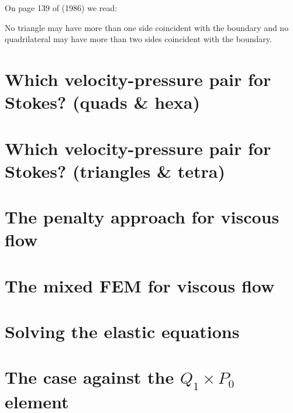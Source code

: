 On page 139 of \textcite{caod86} (1986) we read:
\begin{displayquote}
{\color{darkgray}
No triangle may have more than one side coincident with the boundary
and no quadrilateral may have more than two sides coincident with the boundary.
}
\end{displayquote}

\newpage %
\section{Which velocity-pressure pair for Stokes? (quads \& hexa) \label{ss:pair_quads}}

\newpage %
\section{Which velocity-pressure pair for Stokes? (triangles \& tetra) \label{ss:pair_triangles}}

\newpage %
\section{The penalty approach for viscous flow}\label{sec:penalty} %

\newpage %
\section{The mixed FEM for viscous flow} \label{sec:mixed}  %

\newpage %
\section{Solving the elastic equations}  %

\newpage %
\section{The case against the $Q_1\times P_0$ element}  %

